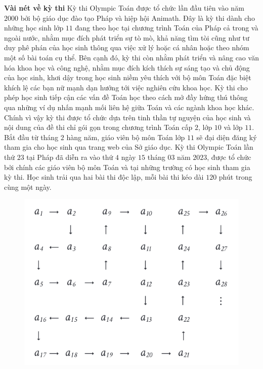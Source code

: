 \begin{multicols}{2}
	\textbf{\color{cackithi}Vài nét về kỳ thi}
	\vskip 0.1cm 
	Kỳ thi Olympic Toán được tổ chức lần đầu tiên vào năm $2000$ bởi bộ giáo dục đào tạo Pháp và hiệp hội Animath. Đây là kỳ thi dành cho những học sinh lớp $11$ đang theo học tại chương trình Toán của Pháp cả trong và ngoài nước, nhằm mục đích phát triển sự tò mò, khả năng tìm tòi cũng như tư duy phê phán của học sinh thông qua việc xử lý hoặc cá nhân hoặc theo nhóm một số bài toán cụ thể. Bên cạnh đó, kỳ thi còn nhằm phát triển và nâng cao văn hóa khoa học và công nghệ, nhằm mục đích kích thích sự sáng tạo và chủ động của học sinh, khơi dậy trong học sinh niềm yêu thích với bộ môn Toán đặc biệt khích lệ các bạn nữ mạnh dạn hướng tới việc nghiên cứu khoa học. Kỳ thi cho phép học sinh tiếp cận các vấn đề Toán học theo cách mở đầy hứng thú thông qua những ví dụ nhấn mạnh mối liên hệ giữa Toán và các ngành khoa học khác. Chính vì vậy kỳ thi được tổ chức dựa trên tinh thần tự nguyện của học sinh và nội dung của đề thi chỉ gói gọn trong chương trình Toán cấp $2$, lớp $10$ và lớp $11$. 
	\vskip 0.1cm
	Bắt đầu từ tháng $2$ hàng năm, giáo viên bộ môn Toán lớp $11$ sẽ đại diện đăng ký tham gia cho học sinh qua trang web của Sở giáo dục. Kỳ thi Olympic Toán lần thứ $23$ tại Pháp đã diễn ra vào thứ $4$ ngày $15$ tháng $03$ năm $2023$, được tổ chức bởi chính các giáo viên bộ môn Toán và tại những trường có học sinh tham gia kỳ thi. Học sinh trải qua hai bài thi độc lập, mỗi bài thi kéo dài $120$ phút trong cùng một ngày. 
	\begin{figure}[H]
		\vspace*{-10pt}
		\centering
		\captionsetup{labelformat= empty, justification=centering}
		\includegraphics[width= 1\linewidth]{1}

\end{figure}
\end{multicols}
